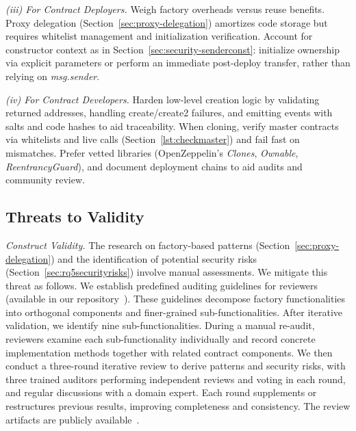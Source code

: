 \documentclass[acmsmall, screen]{acmart}
\begin{document}
	\textit{(iii) For Contract Deployers.} Weigh factory overheads versus reuse benefits. Proxy delegation
	(Section~\ref{sec:proxy-delegation}) amortizes code storage but requires whitelist management and
	initialization verification. Account for constructor context as in Section~\ref{sec:security-senderconst}:
	initialize ownership via explicit parameters or perform an immediate post-deploy transfer,
	rather than relying on \textit{msg.sender}.

	\textit{(iv) For Contract Developers.} Harden low-level creation logic by validating returned
	addresses, handling create/create2 failures, and emitting events with salts and code hashes to
	aid traceability. When cloning, verify master contracts via whitelists and live calls (Section~\ref{lst:checkmaster})
	and fail fast on mismatches. Prefer vetted libraries (OpenZeppelin’s \textit{Clones}, \textit{Ownable},
	\textit{ReentrancyGuard}), and document deployment chains to aid audits and community review.

	\subsection{Threats to Validity}

	\textit{Construct Validity.} The research on factory-based patterns (Section~\ref{sec:proxy-delegation})
	and the identification of potential security risks (Section~\ref{sec:rq5securityrisks}) involve manual
	assessments. We mitigate this threat as follows. We establish predefined auditing guidelines for
	reviewers (available in our repository~\cite{fscdata}). These guidelines decompose factory
	functionalities into orthogonal components and finer-grained sub-functionalities. After iterative
	validation, we identify nine sub-functionalities. During a manual re-audit, reviewers examine
	each sub-functionality individually and record concrete implementation methods together with
	related contract components. We then conduct a three-round iterative review to derive patterns and
	security risks, with three trained auditors performing independent reviews and voting in each
	round, and regular discussions with a domain expert. Each round supplements or restructures
	previous results, improving completeness and consistency. The review artifacts are publicly
	available~\cite{fscdata}.
\end{document}
